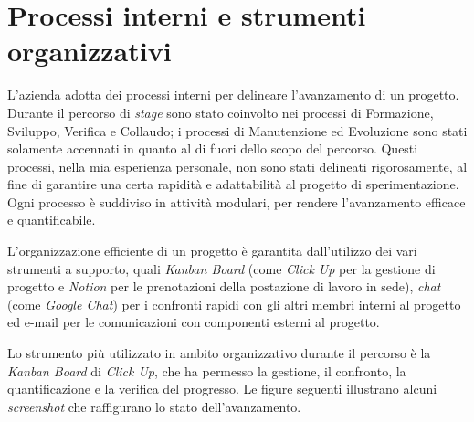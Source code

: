 

\section{Processi interni e strumenti organizzativi}

%


L'azienda adotta dei processi interni per delineare l'avanzamento di un progetto.
Durante il percorso di \textit{stage} sono stato coinvolto nei processi di Formazione, Sviluppo, Verifica e Collaudo; i processi di Manutenzione ed Evoluzione sono stati solamente accennati in quanto al di fuori dello scopo del percorso.
Questi processi, nella mia esperienza personale, non sono stati delineati rigorosamente, al fine di garantire una certa rapidità e adattabilità al progetto di sperimentazione.
Ogni processo è suddiviso in attività modulari, per rendere l'avanzamento efficace e quantificabile.

L'organizzazione efficiente di un progetto è garantita dall'utilizzo dei vari strumenti a supporto, quali \textit{Kanban Board} (come \textit{Click Up} per la gestione di progetto e \textit{Notion} per le prenotazioni della postazione di lavoro in sede), \textit{chat} (come \textit{Google Chat}) per i confronti rapidi con gli altri membri interni al progetto ed e-mail per le comunicazioni con componenti esterni al progetto.

Lo strumento più utilizzato in ambito organizzativo durante il percorso è la \textit{Kanban Board} di \textit{Click Up}, che ha permesso la gestione, il confronto, la quantificazione e la verifica del progresso.
Le figure seguenti illustrano alcuni \textit{screenshot} che raffigurano lo stato dell'avanzamento.


